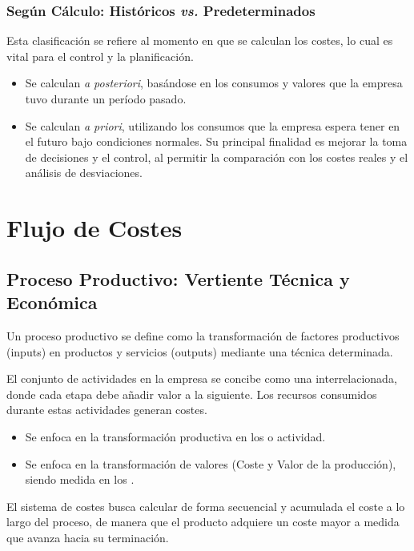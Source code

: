\subsubsection{Según Cálculo: Históricos \textit{vs.} Predeterminados}

Esta clasificación se refiere al momento en que se calculan los costes, lo cual es vital para el control y la planificación.

\begin{itemize}
    \item {} Se calculan \textit{a posteriori}, basándose en los consumos y valores que la empresa tuvo durante un período pasado.
    \item {} Se calculan \textit{a priori}, utilizando los consumos que la empresa espera tener en el futuro bajo condiciones normales. Su principal finalidad es mejorar la toma de decisiones y el control, al permitir la comparación con los costes reales y el análisis de desviaciones.
\end{itemize}

\section{Flujo de Costes}

\subsection{Proceso Productivo: Vertiente Técnica y Económica}

Un proceso productivo se define como la transformación de factores productivos (inputs) en productos y servicios (outputs) mediante una técnica determinada.

El conjunto de actividades en la empresa se concibe como una  interrelacionada, donde cada etapa debe añadir valor a la siguiente. Los recursos consumidos durante estas actividades generan costes.

\begin{itemize}
    \item {} Se enfoca en la transformación productiva en los  o actividad.
    \item {} Se enfoca en la transformación de valores (Coste y Valor de la producción), siendo medida en los .
\end{itemize}
El sistema de costes busca calcular de forma secuencial y acumulada el coste a lo largo del proceso, de manera que el producto adquiere un coste mayor a medida que avanza hacia su terminación.


